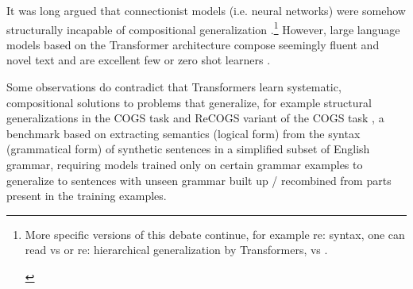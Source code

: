 \documentclass[11pt]{article}
\begin{document}
It was long argued that connectionist models (i.e. neural networks) were somehow structurally incapable of compositional generalization \cite{FodorPylyshyn1988}.\footnote{\begin{footnotesize}
More specific versions of this debate continue, for example re: syntax, one can read \cite{vanschijndel2019quantitydoesntbuyquality} vs \cite{goldberg2019assessingbertssyntacticabilities} or re: hierarchical generalization by Transformers, \cite{petty2021transformersgeneralizelinearly} vs \cite{murty2023grokkinghierarchicalstructurevanilla}.\end{footnotesize}} 
However, large language models based on the Transformer architecture \cite{vaswani2017attention} compose seemingly fluent and novel text and are excellent few or zero shot learners \cite{Brown2020}.

Some observations do contradict that Transformers learn systematic, compositional solutions to problems that generalize, for example structural generalizations
in the COGS task and ReCOGS\cite{Wu2023} variant of the COGS task \cite{KimLinzen2020}
, a benchmark based on extracting semantics (logical form) from the syntax (grammatical form) of synthetic sentences in a simplified subset of English grammar, requiring models trained only on certain grammar examples to generalize to sentences with unseen grammar built up / recombined from parts present in the training examples.
\end{document}
